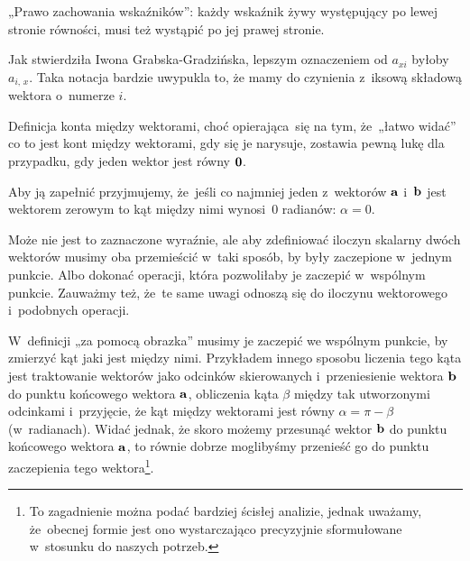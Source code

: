 \documentclass[a4paper,11pt]{article}
\begin{document}
„Prawo zachowania wskaźników”: każdy wskaźnik żywy występujący po lewej
stronie równości, musi też wystąpić po jej prawej stronie.

\vspace{\spaceFour}





\noindent
{} Jak stwierdziła Iwona Grabska-Gradzińska, lepszym
oznaczeniem od $a_{ xi }$ byłoby $a_{ i,\, x }$. Taka notacja bardzie uwypukla
to, że mamy do czynienia z~iksową składową wektora o~numerze $i$.

\vspace{\spaceFour}





\noindent
{} Definicja konta między wektorami, choć opierająca~się na tym,
że~„łatwo widać” co to jest kont między wektorami, gdy się je narysuje,
zostawia pewną lukę dla przypadku, gdy jeden wektor jest równy
$\mathbf{0}$.

Aby ją zapełnić przyjmujemy, że~jeśli co najmniej jeden z~wektorów
$\mathbf{a}$ i~$\mathbf{b}$ jest wektorem zerowym to kąt między nimi
wynosi~$0$ radianów: $\alpha = 0$.

\vspace{\spaceFour}





\noindent
{} Może nie jest to zaznaczone wyraźnie, ale aby zdefiniować iloczyn
skalarny dwóch wektorów musimy oba przemieścić w~taki sposób, by były
zaczepione w~jednym punkcie. Albo dokonać operacji, która pozwoliłaby je
zaczepić w~wspólnym punkcie. Zauważmy też, że~te same uwagi odnoszą się do
iloczynu wektorowego i~podobnych operacji.

W~definicji „za pomocą obrazka” musimy je zaczepić we wspólnym punkcie, by
zmierzyć kąt jaki jest między nimi. Przykładem innego sposobu liczenia tego
kąta jest traktowanie wektorów jako odcinków skierowanych i~przeniesienie
wektora $\mathbf{b}$ do punktu końcowego wektora $\mathbf{a}$, obliczenia kąta
$\beta$ między tak utworzonymi odcinkami i~przyjęcie, że kąt między wektorami
jest równy $\alpha = \pi - \beta$ (w~radianach). Widać jednak, że skoro możemy
przesunąć wektor $\mathbf{b}$ do punktu końcowego wektora $\mathbf{a}$, to
równie dobrze moglibyśmy przenieść go do punktu zaczepienia tego
wektora\footnote{To zagadnienie można podać bardziej ścisłej analizie,
  jednak uważamy, że~obecnej formie jest ono wystarczająco precyzyjnie
  sformułowane w~stosunku do naszych potrzeb.}.
\end{document}
